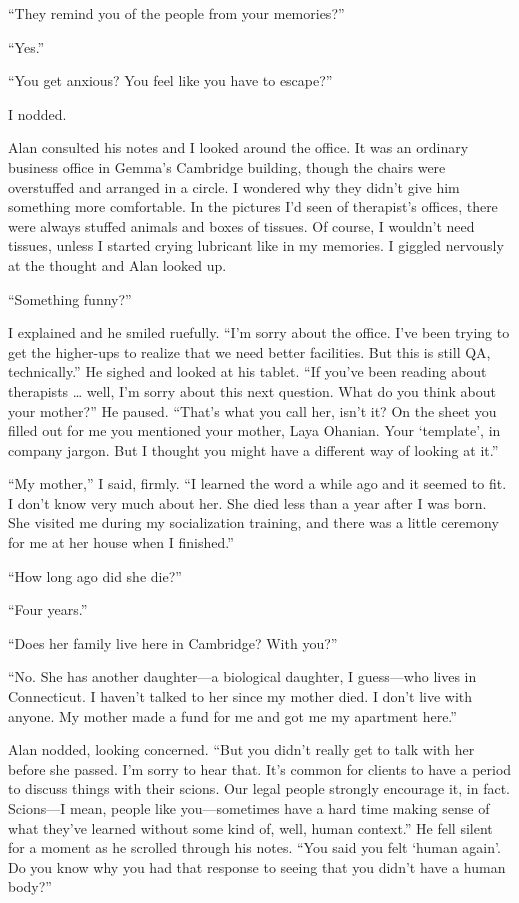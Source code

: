 \documentclass[10pt,b5paper]{article}
\begin{document}
``They remind you of the people from your memories?''

``Yes.''

``You get anxious? You feel like you have to escape?''

I nodded.

Alan consulted his notes and I looked around the office. It was an
ordinary business office in Gemma's Cambridge building, though the
chairs were overstuffed and arranged in a circle. I wondered why
they didn't give him something more comfortable.  In the pictures
I'd seen of therapist's offices, there were always stuffed animals
and boxes of tissues. Of course, I wouldn't need tissues, unless I
started crying lubricant like in my memories.  I giggled nervously
at the thought and Alan looked up.

``Something funny?''

I explained and he smiled ruefully. ``I'm sorry about the office.
I've been trying to get the higher-ups to realize that we need better
facilities. But this is still QA, technically.'' He sighed and looked
at his tablet. ``If you've been reading about therapists \ldots
well, I'm sorry about this next question.  What do you think about
your mother?''  He paused.  ``That's what you call her, isn't it?
On the sheet you filled out for me you mentioned your mother, Laya
Ohanian. Your `template', in company jargon. But I thought you might
have a different way of looking at it.''

``My mother,'' I said, firmly. ``I learned the word a while ago and it
seemed to fit. I don't know very much about her. She died less than a
year after I was born. She visited me during my socialization training,
and there was a little ceremony for me at her house when I finished.''

``How long ago did she die?''

``Four years.''

``Does her family live here in Cambridge? With you?''

``No. She has another daughter---a biological daughter, I guess---who
lives in Connecticut. I haven't talked to her since my mother died. I
don't live with anyone. My mother made a fund for me and got me my
apartment here.''

Alan nodded, looking concerned. ``But you didn't really get to talk
with her before she passed. I'm sorry to hear that. It's common for
clients to have a period to discuss things with their scions. Our
legal people strongly encourage it, in fact.  Scions---I mean, people
like you---sometimes have a hard time making sense of what they've
learned without some kind of, well, human context.''  He fell silent
for a moment as he scrolled through his notes. ``You said you felt
`human again'. Do you know why you had that response to seeing that
you didn't have a human body?''
\end{document}

